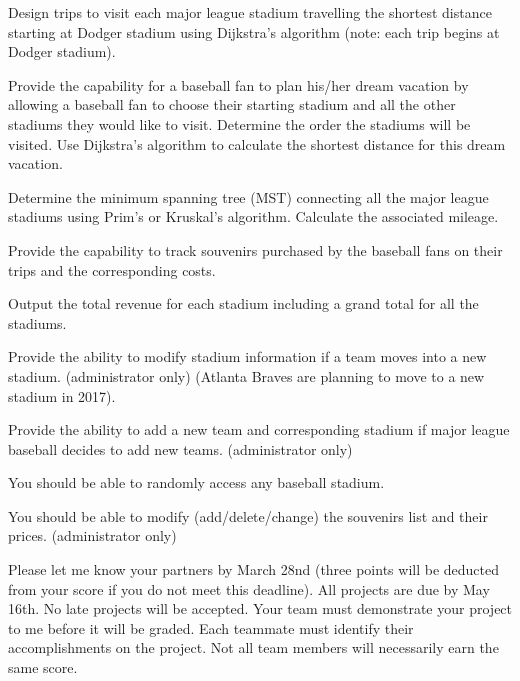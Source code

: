 \begin{DoxyEnumerate}
\item Design trips to visit each major league stadium travelling the shortest distance starting at Dodger stadium using Dijkstra’s algorithm (note\+: each trip begins at Dodger stadium).
\item Provide the capability for a baseball fan to plan his/her dream vacation by allowing a baseball fan to choose their starting stadium and all the other stadiums they would like to visit. Determine the order the stadiums will be visited. Use Dijkstra’s algorithm to calculate the shortest distance for this dream vacation.
\item Determine the minimum spanning tree (M\+ST) connecting all the major league stadiums using Prim’s or Kruskal’s algorithm. Calculate the associated mileage.
\item Provide the capability to track souvenirs purchased by the baseball fans on their trips and the corresponding costs.
\item Output the total revenue for each stadium including a grand total for all the stadiums.
\item Provide the ability to modify stadium information if a team moves into a new stadium. (administrator only) (Atlanta Braves are planning to move to a new stadium in 2017).
\item Provide the ability to add a new team and corresponding stadium if major league baseball decides to add new teams. (administrator only)
\item You should be able to randomly access any baseball stadium.
\item You should be able to modify (add/delete/change) the souvenirs list and their prices. (administrator only)
\end{DoxyEnumerate}

Please let me know your partners by March 28nd (three points will be deducted from your score if you do not meet this deadline). All projects are due by May 16th. No late projects will be accepted. Your team must demonstrate your project to me before it will be graded. Each teammate must identify their accomplishments on the project. Not all team members will necessarily earn the same score.


